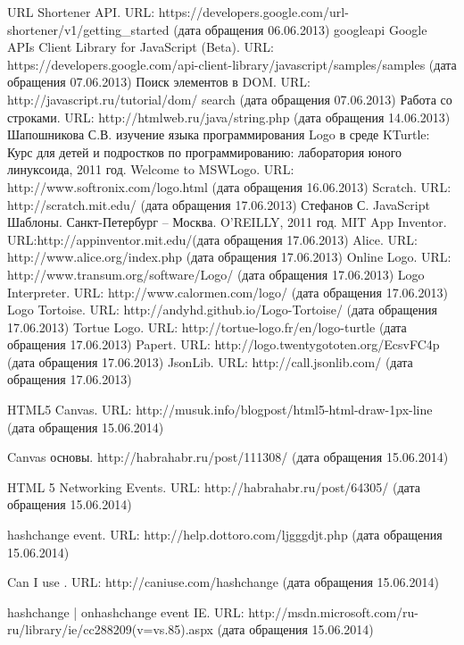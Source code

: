 \begin{thebibliography}{99}
	URL Shortener API. URL: https://developers.google.com/url-shortener/v1/getting\_started (дата обращения 06.06.2013)
\bibitem{}googleapi	Google APIs Client Library for JavaScript (Beta). URL: https://developers.google.com/api-client-library/javascript/samples/samples (дата обращения 07.06.2013)
	Поиск элементов в DOM. URL: http://javascript.ru/tutorial/dom/ search (дата обращения 07.06.2013)
	Работа со строками. URL: http://htmlweb.ru/java/string.php (дата обращения 14.06.2013)
	Шапошникова С.В. изучение языка программирования Logo в среде KTurtle: Курс для детей и подростков по программированию: лаборатория юного линуксоида, 2011 год.
	Welcome to MSWLogo. URL: http://www.softronix.com/logo.html (дата обращения 16.06.2013)
	Scratch. URL: http://scratch.mit.edu/ (дата обращения 17.06.2013)
	Стефанов С. JavaScript Шаблоны. Санкт-Петербург  –  Москва. O'REILLY, 2011 год.
	MIT App Inventor. URL:http://appinventor.mit.edu/(дата обращения 17.06.2013)
	Alice. URL: http://www.alice.org/index.php (дата обращения 17.06.2013)
	Online Logo. URL: http://www.transum.org/software/Logo/ (дата обращения 17.06.2013)
	Logo Interpreter. URL: http://www.calormen.com/logo/ (дата обращения 17.06.2013)
	Logo Tortoise. URL: http://andyhd.github.io/Logo-Tortoise/ (дата обращения 17.06.2013)
	Tortue Logo. URL: http://tortue-logo.fr/en/logo-turtle (дата обращения 17.06.2013)
	Papert. URL: http://logo.twentygototen.org/EcsvFC4p (дата обращения 17.06.2013)
	JsonLib. URL: http://call.jsonlib.com/ (дата обращения 17.06.2013)

	HTML5 Canvas. URL: http://musuk.info/blogpost/html5-html-draw-1px-line (дата обращения 15.06.2014)

	Canvas основы. http://habrahabr.ru/post/111308/ (дата обращения 15.06.2014)

	HTML 5 Networking Events. URL: http://habrahabr.ru/post/64305/ (дата обращения 15.06.2014)

	hashchange event. URL: http://help.dottoro.com/ljgggdjt.php (дата обращения 15.06.2014)

	Can I use . URL: http://caniuse.com/hashchange (дата обращения 15.06.2014)

	hashchange | onhashchange event IE. URL: http://msdn.microsoft.com/ru-ru/library/ie/cc288209(v=vs.85).aspx (дата обращения 15.06.2014)


\end{thebibliography}
